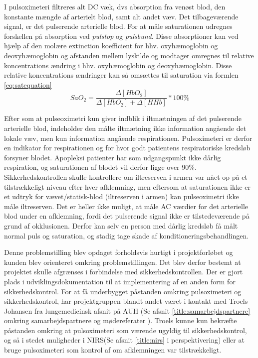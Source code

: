 I pulsoximeteri filtreres alt DC væk, dvs absorption fra venøst blod, den konstante mængde af arterielt blod, samt alt andet væv. Det tilbageværende signal, er det pulserende arterielle blod. For at måle saturationen udregnes forskellen på absorption ved \textit{pulstop} og \textit{pulsbund}. Disse absorptioner kan ved hjælp af den molære extinction koefficient for hhv. oxyhæmoglobin og deoxyhæmoglobin og afstanden mellem lyskilde og modtager omregnes til relative koncentrations ændring i hhv. oxyhæmoglobin og deoxyhæmoglobin. Disse relative koncentrations ændringer kan så omsættes til saturation via formlen \ref{eq:satequation}
\begin{equation}
	SaO_2 = \frac{\Delta[HbO_2]}{\Delta[HbO_2]+\Delta[HHb]} *100\%
	\label{eq:satequation}
\end{equation}

Efter som at pulseoximetri kun giver indblik i iltmætningen af det pulserende arterielle blod, indeholder den målte iltmætning ikke information angående det lokale væv, men kun information angående respirationen. Pulsoximeteri er derfor en indikator for respirationen og for hvor godt patientens respiratoriske kredsløb forsyner blodet. Apopleksi patienter har som udgangspunkt ikke dårlig respiration, og saturationen af blodet vil derfor ligge over 90\%. Sikkerhedskontrollen skulle kontrollere om iltreserven i armen var nået op på et tilstrækkeligt niveau efter hver afklemning, men eftersom at saturationen ikke er et udtryk for vævet/statisk-blod (iltreserven i armen) kan pulseoximetri ikke måle iltreserven.
Det er heller ikke muligt, at måle AC værdier for det arterielle blod under en afklemning, fordi det pulserende signal ikke er tilstedeværende på grund af okklusionen. Derfor kan selv en person med dårlig kredsløb få målt normal puls og saturation, og stadig tage skade af konditioneringsbehandlingen. 

Denne problemstilling blev opdaget forholdsvis hurtigt i projektforløbet og kunden blev orienteret omkring problemstillingen. Det blev derfor bestemt at projektet skulle afgrænses i forbindelse med sikkerhedskontrollen. Der er gjort plads i udviklingsdokumentation til at implementering af en anden form for sikkerhedskontrol. For at få underbygget påstanden omkring pulsoximeteri og sikkerhedskontrol, har projektgruppen blandt andet været i kontakt med Troels Johansen fra lungemedicinsk afsnit på AUH (Se afsnit \ref{title:samarbejdspartnere} omkring samarbejdspartnere og mødereferater ). Troels kunne kun bekræfte påstanden omkring at pulsoximeteri som værende ugyldig til sikkerhedskontrol, og så i stedet muligheder i NIRS(Se afsnit \ref{title:nirs} i perspektivering) eller at bruge pulsoximeteri som kontrol af om afklemningen var tilstrækkeligt. 

